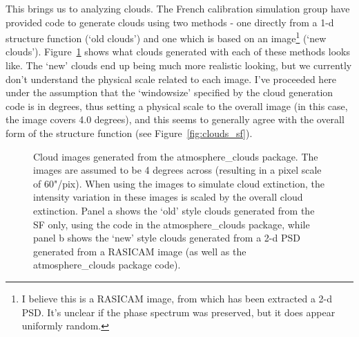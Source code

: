 \documentclass[11pt,preprint]{aastex}
\begin{document}
This brings us to analyzing clouds. The French calibration simulation group have provided code to generate clouds using two methods - one directly from a 1-d structure function (`old clouds') and one which is based on an image\footnote{I believe this is a RASICAM image, from which has been extracted a 2-d PSD. It's unclear if the phase spectrum was preserved, but it does appear uniformly random.} (`new clouds').  Figure~\ref{fig:clouds_images} shows what clouds generated with each of these methods looks like. The `new' clouds end up being much more realistic looking, but we currently don't understand the physical scale related to each image. I've proceeded here under the assumption that the `windowsize' specified by the cloud generation code is in degrees, thus setting a physical scale to the overall image (in this case, the image covers 4.0 degrees), and this seems to generally agree with the overall form of the structure function (see Figure~\ref{fig:clouds_sf}).  

\begin{figure}[htpb]
\centering
{}
\caption{{\small
Cloud images generated from the atmosphere\_clouds package. The images are assumed to be 4 degrees across (resulting in a pixel scale of  60"/pix). When using the images to simulate cloud extinction, the intensity variation in these images is scaled by the overall cloud extinction. Panel a shows the `old' style clouds generated from the SF only, using the code in the atmosphere\_clouds package, while panel b shows the `new' style clouds generated from a 2-d PSD generated from a RASICAM image (as well as the atmosphere\_clouds package code).}}
\label{fig:clouds_images}
\end{figure}
\end{document}
